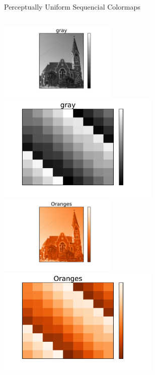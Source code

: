 \documentclass{beamer}
\newcommand{\semitransp}[2][35]{\color{fg!#1}#2}
\begin{document}
\begin{frame}
\begin{center}
\semitransp[0]{Perceptually Uniform Sequencial Colormaps}
\end{center}
\begin{columns}
\begin{column}{0.5\textwidth}
\begin{center}
\vfill
\includegraphics[width=0.42\textwidth]{../church_gray.pdf}
\includegraphics[width=0.58\textwidth]{../magicsquare_gray.pdf}\newline\newline
\vfill
\includegraphics[width=0.42\textwidth]{../church_Oranges.pdf}
\includegraphics[width=0.58\textwidth]{../magicsquare_Oranges.pdf}
\vfill

\end{center}
\end{column}
\end{columns}
\end{frame}
\end{document}

